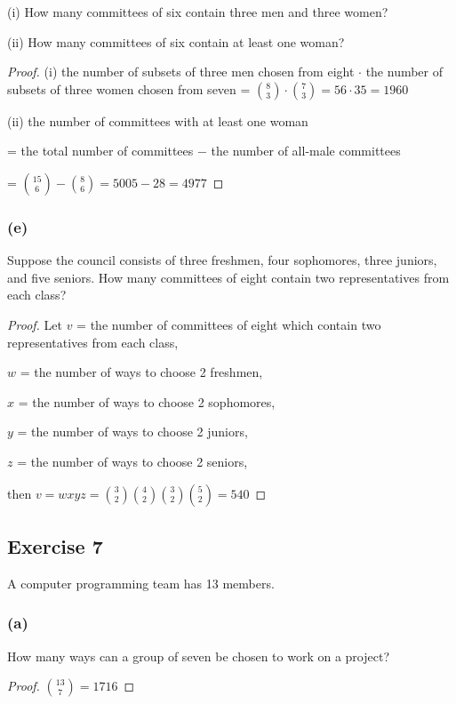 \documentclass[14pt]{extarticle}
\begin{document}
(i) How many committees of six contain three men and three women?

(ii) How many committees of six contain at least one woman?

\begin{proof}
(i) the number of subsets of three men chosen from eight \(\cdot\) the number of subsets of three women chosen from 
seven = \(\binom{8}{3} \cdot \binom{7}{3} = 56 \cdot 35 = 1960\)

(ii) the number of committees with at least one woman 

= the total number of committees \(-\) the number of all-male committees

= \(\binom{15}{6} - \binom{8}{6} = 5005 - 28 = 4977\)
\end{proof}

\subsubsection{(e)}
Suppose the council consists of three freshmen, four sophomores, three juniors, and five seniors. How many 
committees of eight contain two representatives from each class?

\begin{proof}
Let \(v\) = the number of committees of eight which contain two representatives from each class,

\(w\) = the number of ways to choose 2 freshmen,

\(x\) = the number of ways to choose 2 sophomores,

\(y\) = the number of ways to choose 2 juniors,

\(z\) = the number of ways to choose 2 seniors,

then \(v = wxyz = \binom{3}{2}\binom{4}{2}\binom{3}{2}\binom{5}{2} = 540\)
\end{proof}

\subsection{Exercise 7}
A computer programming team has 13 members.

\subsubsection{(a)}
How many ways can a group of seven be chosen to work on a project?

\begin{proof}
\(\binom{13}{7} = 1716\)
\end{proof}
\end{document}
